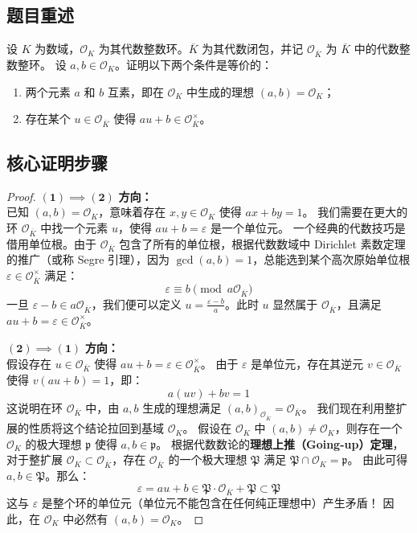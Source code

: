 \documentclass[]{article}
\begin{document}
	\subsection*{题目重述}
	设 $K$ 为数域，$\mathcal{O}_K$ 为其代数整数环。$\overline{K}$ 为其代数闭包，并记 $\mathcal{O}_{\overline{K}}$ 为 $\overline{K}$ 中的代数整数整环。
	设 $a, b \in \mathcal{O}_K$。证明以下两个条件是等价的：
	\begin{enumerate}[label=(\arabic*]
		\item 两个元素 $a$ 和 $b$ 互素，即在 $\mathcal{O}_K$ 中生成的理想 $(a, b) = \mathcal{O}_K$；
		\item 存在某个 $u \in \mathcal{O}_{\overline{K}}$ 使得 $au + b \in \mathcal{O}_{\overline{K}}^\times$。
	\end{enumerate}
	
	\subsection*{核心证明步骤}
	\begin{proof}
		$\mathbf{(1) \implies (2)}$ \textbf{方向：} \\
		已知 $(a,b) = \mathcal{O}_K$，意味着存在 $x, y \in \mathcal{O}_K$ 使得 $ax + by = 1$。
		我们需要在更大的环 $\mathcal{O}_{\overline{K}}$ 中找一个元素 $u$，使得 $au+b = \varepsilon$ 是一个单位元。
		一个经典的代数技巧是借用单位根。由于 $\mathcal{O}_{\overline{K}}$ 包含了所有的单位根，根据代数数域中 Dirichlet 素数定理的推广（或称 Segre 引理），因为 $\gcd(a,b)=1$，总能选到某个高次原始单位根 $\varepsilon \in \mathcal{O}_{\overline{K}}^\times$ 满足：
		\[ \varepsilon \equiv b \pmod{a\mathcal{O}_{\overline{K}}} \]
		一旦 $\varepsilon - b \in a \mathcal{O}_{\overline{K}}$，我们便可以定义 $u = \frac{\varepsilon - b}{a}$。此时 $u$ 显然属于 $\mathcal{O}_{\overline{K}}$，且满足 $au + b = \varepsilon \in \mathcal{O}_{\overline{K}}^\times$。
		
		$\mathbf{(2) \implies (1)}$ \textbf{方向：} \\
		假设存在 $u \in \mathcal{O}_{\overline{K}}$ 使得 $au + b = \varepsilon \in \mathcal{O}_{\overline{K}}^\times$。
		由于 $\varepsilon$ 是单位元，存在其逆元 $v \in \mathcal{O}_{\overline{K}}$ 使得 $v(au+b) = 1$，即：
		\[ a(uv) + bv = 1 \]
		这说明在环 $\mathcal{O}_{\overline{K}}$ 中，由 $a,b$ 生成的理想满足 $(a,b)_{\mathcal{O}_{\overline{K}}} = \mathcal{O}_{\overline{K}}$。
		我们现在利用整扩展的性质将这个结论拉回到基域 $\mathcal{O}_K$。
		假设在 $\mathcal{O}_K$ 中 $(a,b) \neq \mathcal{O}_K$，则存在一个 $\mathcal{O}_K$ 的极大理想 $\mathfrak{p}$ 使得 $a, b \in \mathfrak{p}$。
		根据代数数论的\textbf{理想上推（Going-up）定理}，对于整扩展 $\mathcal{O}_K \subset \mathcal{O}_{\overline{K}}$，存在 $\mathcal{O}_{\overline{K}}$ 的一个极大理想 $\mathfrak{P}$ 满足 $\mathfrak{P} \cap \mathcal{O}_K = \mathfrak{p}$。
		由此可得 $a, b \in \mathfrak{P}$。那么：
		\[ \varepsilon = au + b \in \mathfrak{P} \cdot \mathcal{O}_{\overline{K}} + \mathfrak{P} \subset \mathfrak{P} \]
		这与 $\varepsilon$ 是整个环的单位元（单位元不能包含在任何纯正理想中）产生矛盾！
		因此，在 $\mathcal{O}_K$ 中必然有 $(a,b) = \mathcal{O}_K$。
	\end{proof}
	
\end{document}
